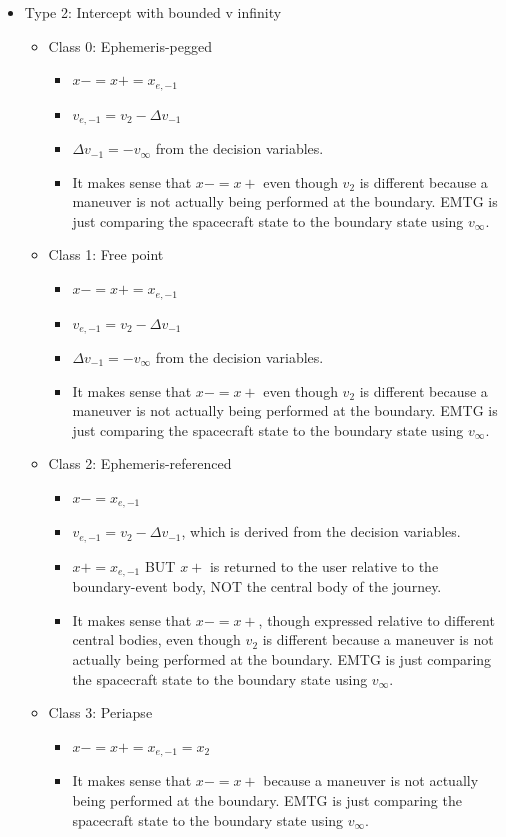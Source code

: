 \documentclass[11pt]{article}
\begin{document}
\begin{itemize}
\begin{itemize}
\begin{itemize}
\begin{itemize}
			\end{itemize}
		\end{itemize}
		\item Type 2: Intercept with bounded v infinity
		\begin{itemize}
			\item Class 0: Ephemeris-pegged
			\begin{itemize}
				\item $x- = x+ = x_{e,-1}$
				\item $v_{e,-1} = v_2 - \Delta v_{-1}$
				\item $\Delta v_{-1} =-v_\infty$ from the decision variables.
				\item It makes sense that $x- = x+$ even though $v_2$ is different because a maneuver is not actually being performed at the boundary. EMTG is just comparing the spacecraft state to the boundary state using $v_\infty$.
			\end{itemize}
			\item Class 1: Free point
			\begin{itemize}
				\item $x- = x+ = x_{e,-1}$
				\item $v_{e,-1} = v_2 - \Delta v_{-1}$
				\item $\Delta v_{-1} =-v_\infty$ from the decision variables.
				\item It makes sense that $x- = x+$ even though $v_2$ is different because a maneuver is not actually being performed at the boundary. EMTG is just comparing the spacecraft state to the boundary state using $v_\infty$.
			\end{itemize}
			\item Class 2: Ephemeris-referenced
			\begin{itemize}
				\item $x- = x_{e,-1}$
				\item $v_{e,-1} = v_2 - \Delta v_{-1}$, which is derived from the decision variables.
				\item $x+ = x_{e,-1}$ BUT $x+$ is returned to the user relative to the boundary-event body, NOT the central body of the journey.
				\item It makes sense that $x- = x+$, though expressed relative to different central bodies, even though $v_2$ is different because a maneuver is not actually being performed at the boundary. EMTG is just comparing the spacecraft state to the boundary state using $v_\infty$.
			\end{itemize}
			\item Class 3: Periapse
			\begin{itemize}
				\item $x- = x+ = x_{e,-1} = x_2$
				\item It makes sense that $x- = x+$ because a maneuver is not actually being performed at the boundary. EMTG is just comparing the spacecraft state to the boundary state using $v_\infty$.
			\end{itemize}
		\end{itemize}
	\end{itemize}
\end{itemize}
\end{document}
